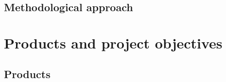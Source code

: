 \documentclass{report}
\begin{document}
	
	
	
	\section{Methodological approach}\label{methodological_approach}
	
	
	
	\chapter{Products and project objectives}
	
	\section{Products}
	
\end{document}
